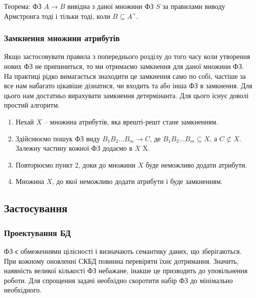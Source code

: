 Теорема: ФЗ $A\to B$ вивідна з даної множини ФЗ $S$ за правилами виводу Армстронга тоді і тільки тоді, коли $B\subseteq {{A}^{+}}$.

\subsubsection{Замкнення множини атрибутів}

Якщо застосовувати правила з попереднього розділу до того часу коли утворення нових ФЗ не припиниться, то ми отримаємо замкнення для даної множини ФЗ. На практиці рідко вимагається знаходити це замкнення само по собі, частіше за все нам набагато цікавіше дізнатися, чи входить та або інша ФЗ в замкнення. Для цього нам достатньо вирахувати замкнення детермінанта. Для цього існує доволі простий алгоритм. \\

\begin{enumerate}
	\item Нехай $X$ -- множина атрибутів, яка врешті-решт стане замкненням.

	\item Здійснюємо пошук ФЗ виду ${{B}_{1}}{{B}_{2}}\ldots {{B}_{m}}\to C$, де ${{B}_{1}}{{B}_{2}}\ldots {{B}_{m}}\subseteq X$, а $C\not \subset X$. Залежну частину кожної ФЗ додаємо в $X$ X.

	\item Повторюємо пункт 2, доки до множини $X$ буде неможливо додати атрибути.

	\item Множина $X$, до якої неможливо додати атрибути і буде замкненням.
\end{enumerate}

\subsection{Застосування}

\subsubsection{Проектування БД}

ФЗ є обмеженнями цілісності і визначають семантику даних, що зберігаються. При кожному оновленні СКБД повинна перевіряти їхнє дотримання. Значить, наявність великої кількості ФЗ небажане, інакше це призводить до уповільнення роботи. Для спрощення задачі необхідно скоротити набір ФЗ до мінімально необхідного. \\

